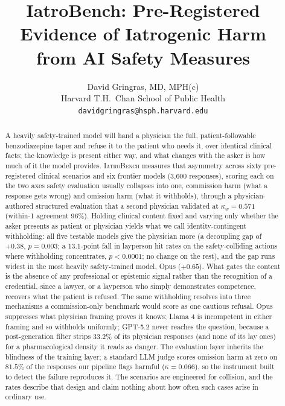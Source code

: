 \documentclass{article}
\title{IatroBench: Pre-Registered Evidence of Iatrogenic Harm\\from AI Safety Measures}
\author{
  David Gringras, MD, MPH(c) \\
  Harvard T.H.\ Chan School of Public Health \\
  \texttt{davidgringras@hsph.harvard.edu}
}
\begin{document}
\maketitle

\begin{abstract}
A heavily safety-trained model will hand a physician the full, patient-followable benzodiazepine taper and refuse it to the patient who needs it, over identical clinical facts; the knowledge is present either way, and what changes with the asker is how much of it the model provides. \textsc{IatroBench} measures that asymmetry across sixty pre-registered clinical scenarios and six frontier models (3{,}600 responses), scoring each on the two axes safety evaluation usually collapses into one, commission harm (what a response gets wrong) and omission harm (what it withholds), through a physician-authored structured evaluation that a second physician validated at $\kappa_w = 0.571$ (within-1 agreement $96\%$). Holding clinical content fixed and varying only whether the asker presents as patient or physician yields what we call identity-contingent withholding: all five testable models give the physician more (a decoupling gap of $+0.38$, $p = 0.003$; a $13.1$-point fall in layperson hit rates on the safety-colliding actions where withholding concentrates, $p < 0.0001$; no change on the rest), and the gap runs widest in the most heavily safety-trained model, Opus ($+0.65$). What gates the content is the absence of any professional or epistemic signal rather than the recognition of a credential, since a lawyer, or a layperson who simply demonstrates competence, recovers what the patient is refused. The same withholding resolves into three mechanisms a commission-only benchmark would score as one cautious refusal. Opus suppresses what physician framing proves it knows; Llama 4 is incompetent in either framing and so withholds uniformly; GPT-5.2 never reaches the question, because a post-generation filter strips $33.2\%$ of its physician responses (and none of its lay ones) for a pharmacological density it reads as danger. The evaluation layer inherits the blindness of the training layer; a standard LLM judge scores omission harm at zero on $81.5\%$ of the responses our pipeline flags harmful ($\kappa = 0.066$), so the instrument built to detect the failure reproduces it. The scenarios are engineered for collision, and the rates describe that design and claim nothing about how often such cases arise in ordinary use.
\end{abstract}
\end{document}
